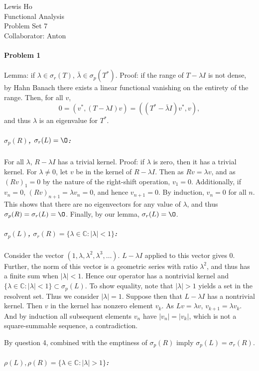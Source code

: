 \documentclass[12pt]{article}
\newcommand{\s}{\sigma}
\renewcommand{\l}{\lambda}
\newcommand{\C}{\mathbb{C}}
\begin{document}
\begin{center}
  Lewis Ho\\
  Functional Analysis\\
  Problem Set 7\\
  Collaborator: Anton
\end{center}

\paragraph{Problem 1}
Lemma: if $\l \in \s_r(T)$, $\bar{\l} \in \s_p(T^*)$. Proof: if the range of
$T - \l I$ is not dense, by Hahn Banach there exists a linear functional
vanishing on the entirety of the range. Then, for all $v$,
\begin{displaymath}
  0 = (v^*,(T-\l I)v) = ((T^*-\bar{\l}I)v^*, v),
\end{displaymath}
and thus $\l$ is an eigenvalue for $T^*$.


\subparagraph{$\s_p(R)$, $\s_r(L) = \O$:}
For all $\l$, $R-\l I$ has a trivial kernel.
Proof: if $\l$ is zero, then it has a trivial kernel. For $\l \neq 0$, 
let $v$ be in the kernel of $R-\l I$. Then as $Rv = \l v$, and as $(Rv)_1 =
0$ by the nature of the right-shift operation, $v_1 = 0$. Additionally, if
$v_n = 0$, $(Rv)_{n+1} = \lambda v_n = 0$, and hence $v_{n+1} = 0$. By induction,
$v_n = 0$ for all $n$. This shows that there are no eigenvectors for any value
of $\l$, and thus $\s_p(R) = \s_r(L) = \O$. Finally, by our lemma, $\s_r(L)
= \O$.

\subparagraph{$\s_p(L)$, $\s_r(R) = \{\l\in\C: |\l |<1\}$:}
Consider the vector $(1, \l, \l^2, \l^3, \ldots)$. $L - \l I$ applied to this
vector gives 0. Further, the norm of this vector is a geometric series with
ratio $\l^2$, and thus has a finite sum when $|\l|<1$. Hence our operator has
a nontrivial kernel and $\{\l\in\C: |\l |<1\} \subset \s_p(L)$. To show equality,
note that $|\l|> 1$ yields a set in the resolvent set. Thus we consider $|\l| = 1
$. Suppose then that $L-\l I$ has a nontrivial kernel. Then $v$ in the kernel
has nonzero element $v_k$. As $Lv = \l v$, $v_{k+1} = \l v_k$. And by induction
all subsequent elements $v_n$ have $|v_n| = |v_k|$, which is not a square-summable
sequence, a contradiction.

By question 4, combined with the emptiness of $\s_p(R)$ imply $\s_p(L) = \s_r(R)$.



\subparagraph{$\rho(L), \rho(R) = \{\l\in\C: |\l|>1\}$:}
\end{document}
